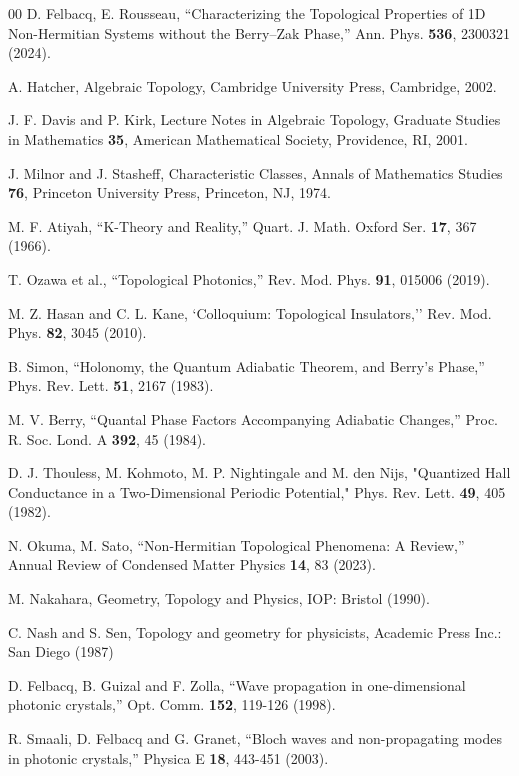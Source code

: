 \documentclass[preprint,12pt]{elsarticle}
\begin{document}
\begin{thebibliography}{00}
 D. Felbacq, E. Rousseau, ``Characterizing the Topological Properties of 1D Non-Hermitian Systems without the Berry--Zak Phase,'' Ann. Phys. {\bf 536}, 2300321 (2024).

 A. Hatcher, Algebraic Topology, Cambridge University Press, Cambridge, 2002.

 J. F. Davis and P. Kirk, Lecture Notes in Algebraic Topology, Graduate Studies in Mathematics {\bf 35}, American Mathematical Society, Providence, RI, 2001.

 J. Milnor and J. Stasheff, Characteristic Classes, Annals of Mathematics Studies {\bf 76}, Princeton University Press, Princeton, NJ, 1974.

 M. F. Atiyah, ``K-Theory and Reality,'' Quart. J. Math. Oxford Ser.  {\bf 17}, 367 (1966).

 T. Ozawa et al., ``Topological Photonics,'' Rev. Mod. Phys. {\bf 91}, 015006 (2019).

 M. Z. Hasan and C. L. Kane, `Colloquium: Topological Insulators,'' Rev. Mod. Phys. {\bf 82}, 3045 (2010).

 B. Simon, ``Holonomy, the Quantum Adiabatic Theorem, and Berry's Phase,'' Phys. Rev. Lett. {\bf 51}, 2167 (1983).

 M. V. Berry, ``Quantal Phase Factors Accompanying Adiabatic Changes,'' Proc. R. Soc. Lond. A {\bf 392}, 45 (1984).

 D. J. Thouless, M. Kohmoto, M. P. Nightingale and M. den Nijs, "Quantized Hall Conductance in a Two-Dimensional Periodic Potential," Phys. Rev. Lett. {\bf 49}, 405 (1982).

 N. Okuma, M. Sato, ``Non-Hermitian Topological Phenomena: A Review,'' Annual Review of Condensed Matter Physics {\bf 14}, 83 (2023).

 M. Nakahara, Geometry, Topology and Physics, IOP: Bristol (1990).

 C. Nash and S. Sen, Topology and geometry for physicists, Academic Press Inc.: San Diego (1987)

 D. Felbacq, B. Guizal and F. Zolla, ``Wave propagation in one-dimensional photonic crystals,'' Opt. Comm. {\bf 152}, 119-126 (1998).

 R. Smaali, D. Felbacq and G. Granet, ``Bloch waves and non-propagating modes in photonic crystals,'' Physica E {\bf 18}, 443-451 (2003). 


\end{thebibliography}
\end{document}
